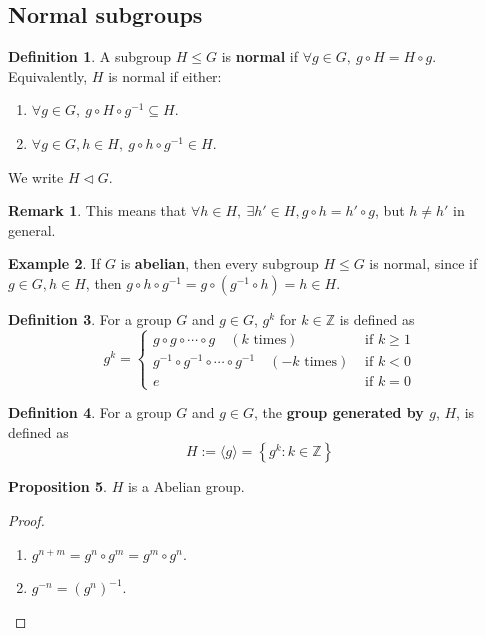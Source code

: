 \documentclass[12pt,a4paper]{article}
\theoremstyle{definition}
\newtheorem{definition}{Definition}[subsection]
\newtheorem{proposition}[definition]{Proposition}
\newtheorem{example}[definition]{Example}
\newtheorem*{remark}{Remark}
\begin{document}
\subsection{Normal subgroups}

\begin{definition}
	A subgroup $H \le G$ is \textbf{normal} if $\forall g \in G, \ g \circ H = H \circ g$. Equivalently, $H$ is normal if either:
	\begin{enumerate}
		\item $\forall g \in G, \ g \circ H \circ g^{-1} \subseteq H$.
		\item $\forall g \in G, h \in H, \ g \circ h \circ g^{-1} \in H$.
	\end{enumerate}
	We write $H \triangleleft G$.
\end{definition}

\begin{remark}
	This means that $\forall h \in H, \ \exists h' \in H, g \circ h = h' \circ g$, but $h \ne h'$ in general.
\end{remark}

\begin{example}
	If $G$ is \textbf{abelian}, then every subgroup $H \le G$ is normal, since if $g \in G, h \in H$, then $g \circ h \circ g^{-1} = g \circ (g^{-1} \circ h) = h \in H$.
\end{example}

\begin{definition}
	For a group $G$ and $g \in G$, $g^k$ for $k \in \mathbb{Z}$ is defined as
	\[
		g^k = \begin{cases}
			g \circ g \circ \cdots \circ g \quad (k \text{ times}) & \text{ if } k \ge 1 \\
			g^{-1} \circ g^{-1} \circ \cdots \circ g^{-1} \quad (-k \text{ times}) & \text{ if } k < 0 \\
			e & \text{ if } k = 0
		\end{cases}
	\]
\end{definition}

\begin{definition}
	For a group $G$ and $g \in G$, the \textbf{group generated by $g$}, $H$, is defined as
	\[
		H := \langle g \rangle = \left\{ g^k: k \in \mathbb{Z} \right\}
	\]
\end{definition}

\begin{proposition}
	$H$ is a Abelian group.
\end{proposition}

\begin{proof}
	\hfill
	\begin{enumerate}
		\item $g^{n + m} = g^n \circ g^m = g^m \circ g^n$.
		\item $g^{-n} = {\left( g^n \right)}^{-1}$.
	\end{enumerate}
\end{proof}
\end{document}
